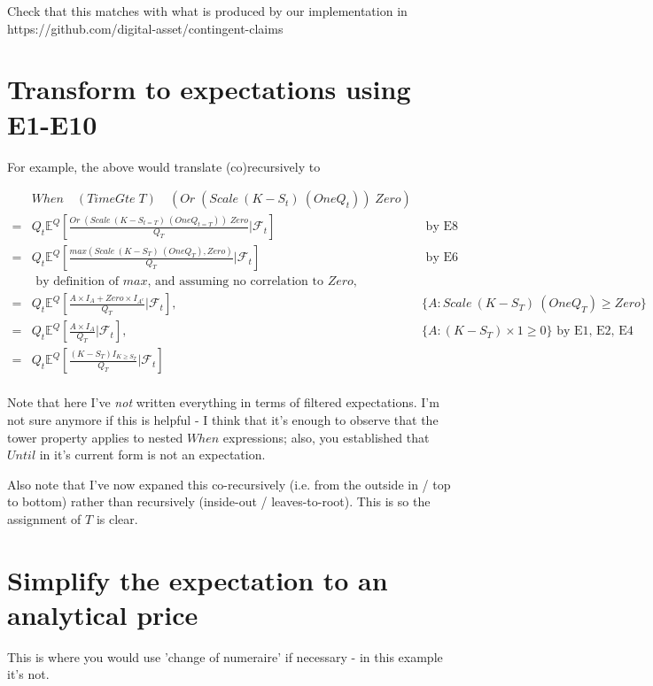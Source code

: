 \documentclass[a4paper]{article}
\begin{document}
Check that this matches with what is produced by our implementation in https://github.com/digital-asset/contingent-claims

\section{Transform to expectations using E1-E10}

For example, the above would translate (co)recursively to

\begin{align*}
& When \quad (TimeGte \; T) \quad (Or \; (Scale \: (K - S_t) \: (One Q_t)) \; Zero) \\
= & Q_t \mathbb{E}^Q[ \frac{ Or \; (Scale \: (K - S_{t = T}) \: (One Q_{t = T})) \; Zero } { Q_T } | \mathcal{F}_t ] & \text{ by E8} \\
= & Q_t \mathbb{E}^Q[ \frac{ max ( Scale \: (K - S_T) \: (One Q_T) , Zero ) } { Q_T } | \mathcal{F}_t ] & \text{ by E6} \\
& \text{ by definition of $max$, and assuming no correlation to $Zero$, } \\
= & Q_t \mathbb{E}^Q[ \frac{  A \times I_A  + Zero \times I_{A^c}} { Q_T } | \mathcal{F}_t ] , & \{ A : Scale \: (K - S_T) \: (One Q_T) \geq Zero \} \\
= & Q_t \mathbb{E}^Q[ \frac{  A \times I_A } { Q_T } | \mathcal{F}_t ] , & \{ A : (K - S_T) \times 1 \geq 0 \} \text{ by E1, E2, E4} \\
= & Q_t \mathbb{E}^Q[ \frac{  (K - S_T) I_{K \geq S_T} } { Q_T } | \mathcal{F}_t ] \\
\end{align*}

Note that here I've \emph{not} written everything in terms of filtered expectations. I'm not sure anymore if this is helpful - I think that it's enough to observe that the tower property applies to nested $When$ expressions; also, you established that $Until$ in it's current form is not an expectation. 

Also note that I've now expaned this co-recursively (i.e. from the outside in / top to bottom) rather than recursively (inside-out / leaves-to-root). This is so the assignment of $T$ is clear.

\section{Simplify the expectation to an analytical price}

This is where you would use 'change of numeraire' if necessary - in this example it's not.
\end{document}
